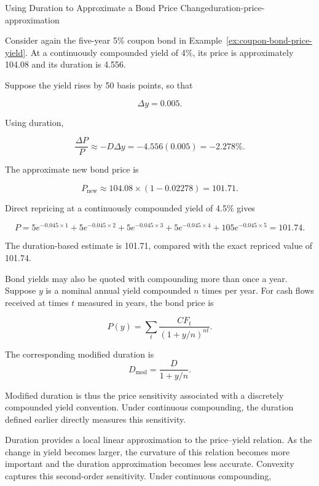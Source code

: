 \begin{example}{Using Duration to Approximate a Bond Price Change}{duration-price-approximation}

Consider again the five-year 5\% coupon bond in Example~\ref{ex:coupon-bond-price-yield}. At a continuously compounded yield of 4\%, its price is approximately 104.08 and its duration is 4.556.

Suppose the yield rises by 50 basis points, so that

\[
\Delta y=0.005.
\]

Using duration,

\[
\frac{\Delta P}{P}
\approx
-D\Delta y
=
-4.556(0.005)
=
-2.278\%.
\]

The approximate new bond price is

\[
P_{\mathrm{new}}
\approx
104.08\times(1-0.02278)
=
101.71.
\]

Direct repricing at a continuously compounded yield of 4.5\% gives

\[
P
=
5e^{-0.045\times1}
+
5e^{-0.045\times2}
+
5e^{-0.045\times3}
+
5e^{-0.045\times4}
+
105e^{-0.045\times5}
=
101.74.
\]

The duration-based estimate is 101.71, compared with
the exact repriced value of 101.74.

\end{example}

Bond yields may also be quoted with compounding more than once a year. Suppose $y$ is a nominal annual yield compounded $n$ times per year. For cash flows received at times $t$ measured in years, the bond price is

\begin{equation}
P(y)
=
\sum_{t}
\frac{CF_t}{(1+y/n)^{nt}}.
\label{eq:ch8-bond-price-n-compounding}
\end{equation}

The corresponding modified duration is 
\begin{equation}
D_{\mathrm{mod}}
=
\frac{D}{1+y/n}.
\label{eq:ch8-modified-duration-relation}
\end{equation}

Modified duration is thus the price sensitivity associated with a discretely compounded yield convention. Under continuous compounding, the duration defined earlier directly measures this sensitivity.

Duration provides a local linear approximation to the price--yield relation. As the change in yield becomes larger, the curvature of this relation becomes more important and the duration approximation becomes less accurate. Convexity captures this second-order sensitivity. Under continuous compounding,

